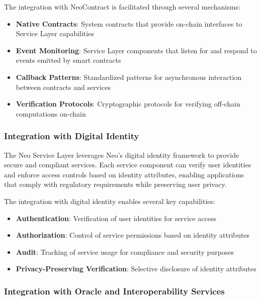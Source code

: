 The integration with NeoContract is facilitated through several mechanisms:

\begin{itemize}
    \item \textbf{Native Contracts}: System contracts that provide on-chain interfaces to Service Layer capabilities
    \item \textbf{Event Monitoring}: Service Layer components that listen for and respond to events emitted by smart contracts
    \item \textbf{Callback Patterns}: Standardized patterns for asynchronous interaction between contracts and services
    \item \textbf{Verification Protocols}: Cryptographic protocols for verifying off-chain computations on-chain
\end{itemize}

\subsubsection{Integration with Digital Identity}
\label{subsubsec:identity-integration}

The Neo Service Layer leverages Neo's digital identity framework to provide secure and compliant services. Each service component can verify user identities and enforce access controls based on identity attributes, enabling applications that comply with regulatory requirements while preserving user privacy.

The integration with digital identity enables several key capabilities:

\begin{itemize}
    \item \textbf{Authentication}: Verification of user identities for service access
    \item \textbf{Authorization}: Control of service permissions based on identity attributes
    \item \textbf{Audit}: Tracking of service usage for compliance and security purposes
    \item \textbf{Privacy-Preserving Verification}: Selective disclosure of identity attributes
\end{itemize}

\subsubsection{Integration with Oracle and Interoperability Services}
\label{subsubsec:oracle-interop-integration}

